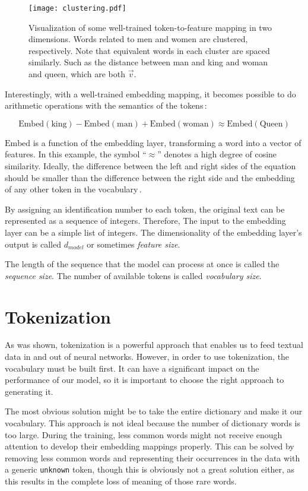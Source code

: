 \begin{figure}[]
  \centering
  \texttt{[image: clustering.pdf]}
  \caption{Visualization of some well-trained token-to-feature mapping in two dimensions. Words related to men and women are clustered, respectively. Note that equivalent words in each cluster are spaced similarly. Such as the distance between man and king and woman and queen, which are both $\vec{v}$.}
  \label{fig:clustering}
\end{figure}

Interestingly, with a well-trained embedding mapping, it becomes possible to do arithmetic operations with the semantics of the tokens\,\cite{mikolov2013efficient}:

\begin{equation}
  \text{Embed}(\text{king}) - \text{Embed}(\text{man}) + \text{Embed}(\text{woman}) \approx \text{Embed}(\text{Queen})
\end{equation}

$\text{Embed}$ is a function of the embedding layer, transforming a word into a vector of features. In this example, the symbol ``$\approx$'' denotes a high degree of cosine similarity. Ideally, the difference between the left and right sides of the equation should be smaller than the difference between the right side and the embedding of any other token in the vocabulary\,\cite{mikolov2013efficient}.

By assigning an identification number to each token, the original text can be represented as a sequence of integers. Therefore, The input to the embedding layer can be a simple list of integers. The dimensionality of the embedding layer's output is called $d_{model}$ or sometimes \emph{feature size}.

The length of the sequence that the model can process at once is called the \emph{sequence size}. The number of available tokens is called \emph{vocabulary size}.

\section{Tokenization}
As was shown, tokenization is a powerful approach that enables us to feed textual data in and out of neural networks. However, in order to use tokenization, the vocabulary must be built first. It can have a significant impact on the performance of our model, so it is important to choose the right approach to generating it.

The most obvious solution might be to take the entire dictionary and make it our vocabulary. This approach is not ideal because the number of dictionary words is too large. During the training, less common words might not receive enough attention to develop their embedding mappings properly. This can be solved by removing less common words and representing their occurrences in the data with a generic \texttt{unknown} token, though this is obviously not a great solution either, as this results in the complete loss of meaning of those rare words.

